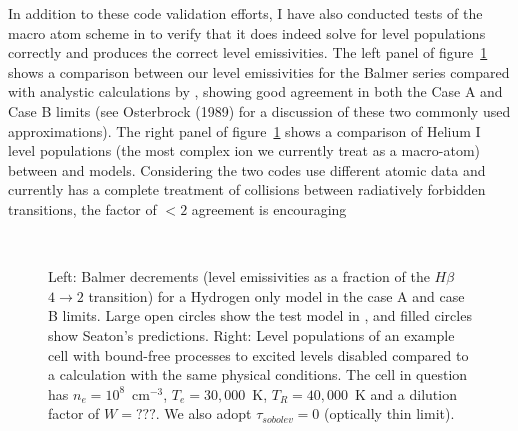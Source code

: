 \documentclass[useAMS,usenatbib,onecolumn]{mn2e2}
\begin{document}
In addition to these code validation efforts, I have also conducted tests of
the macro atom scheme in \py to verify that it does indeed solve for level populations correctly
and produces the correct level emissivities. The left panel of figure~\ref{seaton} shows a comparison
between our level emissivities for the Balmer series compared with analystic calculations
by \cite{seaton1959}, showing good agreement in both the Case A and Case B limits 
(see Osterbrock (1989) for a discussion of these two commonly used approximations).
The right panel of figure~\ref{seaton} shows a comparison of Helium I level populations (the most
complex ion we currently treat as a macro-atom) between \py and \tar models. Considering the 
two codes use different atomic data and \tar currently has a complete treatment of
collisions between radiatively forbidden transitions, the factor of $<2$ agreement is 
encouraging 

\begin{figure}
\mbox{
\quad
{}  
}
\caption{
Left: Balmer decrements (level emissivities as a fraction of the $H\beta$ $4\rightarrow2$ transition)
for a Hydrogen only model in the case A and case B limits. Large open circles show
the test model in \py, and filled circles show Seaton's predictions.
Right: Level populations of an example cell with bound-free processes
to excited levels disabled compared to a \tar calculation with the same physical conditions. 
The cell in question has $n_e = 10^8$~cm$^{-3}$, $T_e = 30,000$~K, $T_R = 40,000$~K
and a dilution factor of $W=???$. We also adopt $\tau_{sobolev} = 0$ 
(optically thin limit).
}
\label{seaton}
\end{figure}
\end{document}
